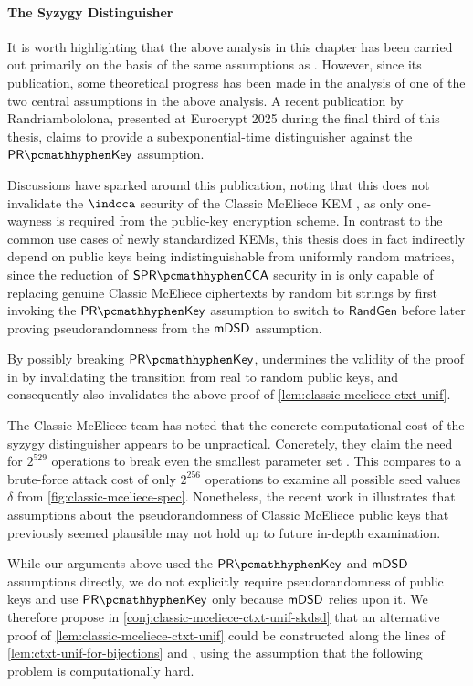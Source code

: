 \paragraph{The Syzygy Distinguisher}

It is worth highlighting that the above analysis in this chapter has been carried out primarily on the basis of the same assumptions as \cite{EC:Xagawa22}. However, since its publication, some theoretical progress has been made in the analysis of one of the two central assumptions in the above analysis. A recent publication by Randriambololona, presented at Eurocrypt 2025 during the final third of this thesis, \cite{cryptoeprint:2024/1193} claims to provide a subexponential-time distinguisher against the $\prkey$ assumption.

Discussions have sparked around this publication, noting that this does not invalidate the $\indcca$ security of the Classic McEliece KEM \cite{mceliece-529-20250417}, as only one-wayness is required from the public-key encryption scheme.
In contrast to the common use cases of newly standardized KEMs, this thesis does in fact indirectly depend on public keys being indistinguishable from uniformly random matrices, since the reduction of $\sprcca$ security in \cite{EC:Xagawa22} is only capable of replacing genuine Classic McEliece ciphertexts by random bit strings by first invoking the $\prkey$ assumption to switch to $\mathsf{RandGen}$ before later proving pseudorandomness from the $\mathsf{mDSD}$ assumption.

By possibly breaking $\prkey$, \cite{cryptoeprint:2024/1193} undermines the validity of the proof in \cite{EC:Xagawa22} by invalidating the transition from real to random public keys, and consequently also invalidates the above proof of \cref{lem:classic-mceliece-ctxt-unif}.

The Classic McEliece team has noted that the concrete computational cost of the syzygy distinguisher appears to be unpractical. Concretely, they claim the need for $2^{529}$ operations to break even the smallest parameter set \cite{mceliece-529-20250417}. This compares to a brute-force attack cost of only $2^{256}$ operations to examine all possible seed values $\delta$ from \cref{fig:classic-mceliece-spec}.
Nonetheless, the recent work in \cite{cryptoeprint:2024/1193} illustrates that assumptions about the pseudorandomness of Classic McEliece public keys that previously seemed plausible may not hold up to future in-depth examination.

While our arguments above used the $\prkey$ and $\mathsf{mDSD}$ assumptions directly, we do not explicitly require pseudorandomness of public keys and use $\prkey$ only because $\mathsf{mDSD}$ relies upon it.
We therefore propose in \cref{conj:classic-mceliece-ctxt-unif-skdsd} that an alternative proof of \cref{lem:classic-mceliece-ctxt-unif} could be constructed along the lines of \cref{lem:ctxt-unif-for-bijections} and \cite{EC:Xagawa22}, using the assumption that the following problem is computationally hard.

